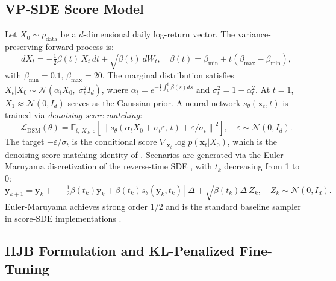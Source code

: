 \documentclass{article}
\newcommand{\E}{\mathbb{E}}
\newcommand{\calN}{\mathcal{N}}
\newcommand{\bx}{\mathbf{x}}
\newcommand{\by}{\mathbf{y}}
\begin{document}
\subsection{VP-SDE Score Model}

Let $X_0 \sim p_\text{data}$ be a $d$-dimensional daily log-return vector. The
variance-preserving forward process \citep{song2021score} is:
\begin{equation}
  dX_t = -\tfrac{1}{2}\beta(t)\,X_t\,dt + \sqrt{\beta(t)}\,dW_t,
  \quad \beta(t) = \beta_{\min} + t(\beta_{\max}-\beta_{\min}),
  \label{eq:vpsde-forward}
\end{equation}
with $\beta_{\min}=0.1$, $\beta_{\max}=20$. The marginal distribution satisfies
$X_t|X_0 \sim \calN(\alpha_t X_0,\;\sigma_t^2 I_d)$, where
$\alpha_t = e^{-\frac{1}{2}\int_0^t \beta(s)ds}$ and $\sigma_t^2 = 1-\alpha_t^2$.
At $t=1$, $X_1\approx\calN(0,I_d)$ serves as the Gaussian prior. A neural network $s_\theta(\bx_t, t)$ is trained via \emph{denoising score matching}:
\begin{equation}
  \mathcal{L}_\text{DSM}(\theta)
  = \E_{t,\,X_0,\,\varepsilon}\!\left[
      \left\| s_\theta(\alpha_t X_0 + \sigma_t\varepsilon,\, t)
              + \varepsilon/\sigma_t \right\|^2
    \right],\quad \varepsilon\sim\calN(0,I_d).
\end{equation}
The target $-\varepsilon/\sigma_t$ is the conditional score
$\nabla_{\bx_t}\log p(\bx_t|X_0)$, which is the denoising score matching identity
of \citet{song2019generative,song2021score}. Scenarios are generated via the
Euler-Maruyama discretization of the reverse-time SDE
\citep{anderson1982reverse,song2021score}, with $t_k$ decreasing from 1 to 0:
\begin{equation}
  \by_{k+1}
  = \by_k + \left[-\tfrac{1}{2}\beta(t_k)\by_k
          + \beta(t_k)s_\theta(\by_k,t_k)\right]\Delta
        + \sqrt{\beta(t_k)\Delta}\,Z_k,\quad Z_k\sim\calN(0,I_d).
  \label{eq:em-sampler}
\end{equation}
Euler-Maruyama achieves strong order $1/2$ and is the standard baseline sampler
in score-SDE implementations \citep{kloeden1992numerical}.

\subsection{HJB Formulation and KL-Penalized Fine-Tuning}
\end{document}
